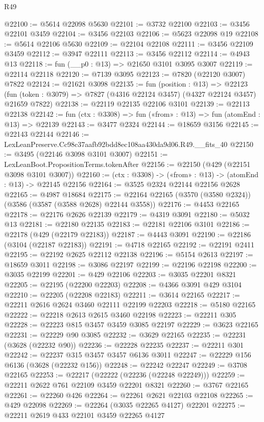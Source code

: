 \begin{lexlean}{R49}
\begin{coremodule}
@22100 := @5614 @22098 @5630
@22101 := @3732 @22100
@22103 := @3456 @22101 @3459
@22104 := @3456 @22103
@22106 := @5623 @22098 @19
@22108 := @5614 @22106 @5630
@22109 := @22104 @22108
@22111 := @3456 @22109 @3459
@22112 := @3947 @22111
@22113 := @3456 @22112
@22114 := @4943 @13
@22118 := fun (__p0 : @13) => @21650 @3101 @3095 @3007
@22119 := @22114 @22118
@22120 := @7139 @3095
@22123 := @7820 (@22120 @3007) @7822
@22124 := @21621 @3098
@22135 := fun (position : @13) =>
  @22123 (fun (token : @3079) => @7827 (@4316 @22124 @3457) (@4327 @22124 @3457) @21659 @7822)
@22138 := @22119 @22135 @22106 @3101
@22139 := @22113 @22138
@22142 := fun (ctx : @3308) => fun («from» : @13) => fun (atomEnd : @13) => @22139
@22143 := @3477 @2324
@22144 := @18659 @3156
@22145 := @22143 @22144
@22146 := LexLeanPreserve.Cc98c37aafb92bdd8ec108aa430da9d06.R49.__fits_40
@22150 := @3495 (@22146 @3098 @3101 @3007)
@22151 := LexLeanBoot.PropositionTerms.tokenAfter
@22156 := @22150 (@429 (@22151 @3098 @3101 @3007))
@22160 := (ctx : @3308) -> («from» : @13) -> (atomEnd : @13) -> @22145 @22156
@22164 := @3525 @2324 @22144 @22156 @2628
@22165 := @4987 @18684
@22175 := @22164 @22165 (@3570 (@3580 @2324)) (@3586 (@3587 (@3588 @2628) @22144 @3558))
@22176 := @4453 @22165
@22178 := @22176 @2626 @22139
@22179 := @4319 @3091
@22180 := @5032 @13
@22181 := @22180 @22135
@22183 := @22181 @22106 @3101
@22186 := @22178 (@429 (@22179 @22183))
@22187 := @4443 @3091
@22190 := @22186 (@3104 (@22187 @22183))
@22191 := @4718 @22165
@22192 := @22191 @2411
@22195 := @22192 @2625 @22112 @22138
@22196 := @5154 @2613
@22197 := @18659 @3011
@22198 := @3086 @22197
@22199 := @22196 @22198
@22200 := @3035 @22199
@22201 := @429 @22106
@22203 := @3035 @22201 @8321
@22205 := @22195 (@22200 @22203)
@22208 := @4366 @3091 @429 @3104
@22210 := @22205 (@22208 @22183)
@22211 := @3614 @22165
@22217 := @22211 @2616 @2624 @3460 @22111 @22199 @22203
@22218 := @5180 @22165
@22222 := @22218 @2613 @2615 @3460 @22198
@22223 := @22211 @305
@22228 := @22223 @815 @3457 @3459 @3085 @22197
@22229 := @3623 @22165
@22231 := @22229 @90 @3085
@22232 := @3629 @22165
@22235 := @22231 (@3628 (@22232 @90))
@22236 := @22228 @22235
@22237 := @22211 @301
@22242 := @22237 @315 @3457 @3457 @6136 @3011
@22247 := @22229 @156 @6136 (@3628 (@22232 @156))
@22248 := @22242 @22247
@22249 := @3708 @22165
@22253 := @22217 (@22222 (@22236 (@22248 @22249)))
@22259 := @22211 @2622 @761 @22109 @3459 @22201 @8321
@22260 := @3767 @22165
@22261 := @22260 @426
@22264 := @22261 @2621 @22103 @22108
@22265 := @429 @22098
@22269 := @22264 (@3035 @22265 @4127) @22201
@22275 := @22211 @2619 @433 @22101 @3459 @22265 @4127

\end{coremodule}
\end{lexlean}
